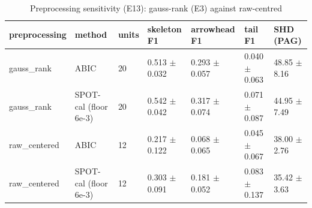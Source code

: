 \begin{table}[t]
\centering\footnotesize
\caption{Preprocessing sensitivity (E13): gauss-rank (E3) against raw-centred}\label{tab:T2f_preprocessing}
\begin{tabular}{@{}lllllll@{}}
\toprule
preprocessing & method & units & skeleton F1 & arrowhead F1 & tail F1 & SHD (PAG)\\
\midrule
gauss\_rank & ABIC & 20 & 0.513 $\pm$ 0.032 & 0.293 $\pm$ 0.057 & 0.040 $\pm$ 0.063 & 48.85 $\pm$ 8.16\\
gauss\_rank & SPOT-cal (floor 6e-3) & 20 & 0.542 $\pm$ 0.042 & 0.317 $\pm$ 0.074 & 0.071 $\pm$ 0.087 & 44.95 $\pm$ 7.49\\
raw\_centered & ABIC & 12 & 0.217 $\pm$ 0.122 & 0.068 $\pm$ 0.065 & 0.045 $\pm$ 0.067 & 38.00 $\pm$ 2.76\\
raw\_centered & SPOT-cal (floor 6e-3) & 12 & 0.303 $\pm$ 0.091 & 0.181 $\pm$ 0.052 & 0.083 $\pm$ 0.137 & 35.42 $\pm$ 3.63\\
\bottomrule
\end{tabular}
\end{table}
